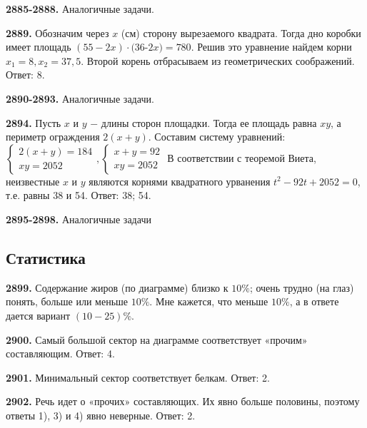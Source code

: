 \textbf{2885-2888.} Аналогичные задачи.

\textbf{2889.} Обозначим через $x$ (см) сторону вырезаемого квадрата. Тогда дно коробки имеет площадь $(55 - 2x)\cdot(36 $-$ 2x)=780$. Решив это уравнение найдем корни $x_1=8, x_2=37,5.$ Второй корень отбрасываем из геометрических соображений. \newline \null \hspace*{\fill} Ответ: 8. 

\textbf{2890-2893.} Аналогичные задачи.

\textbf{2894.} Пусть $x$ и $y$ $-$ длины сторон площадки. Тогда ее площадь равна $xy$, а периметр ограждения $2(x+y).$ Составим систему уравнений:\newline$
\begin{cases}
	2(x+y)=184\\
	xy=2052
\end{cases},
\begin{cases}
	x + y = 92\\
	xy=2052
\end{cases}$
В соответствии с теоремой Виета, неизвестные $x$ и $y$ являются корнями квадратного урванения $t^2 - 92t + 2052 = 0$, т.е. равны 38 и 54. \newline \null \hspace*{\fill} Ответ: 38; 54. 

\textbf{2895-2898.} Аналогичные задачи


\subsection{Статистика}

\textbf{2899.} Содержание жиров (по диаграмме) близко к $10\%$; очень трудно (на глаз) понять, больше или меньше $10\%.$ Мне кажется, что меньше $10\%$, а в ответе дается вариант  $(10-25)\%$.

\textbf{2900.} Самый большой сектор на диаграмме соответствует «прочим» составляющим. \newline \null \hspace*{\fill} Ответ: 4. 

\textbf{2901.} Минимальный сектор соответствует белкам. \newline \null \hspace*{\fill} Ответ: 2. 

\textbf{2902.} Речь идет о «прочих» составляющих. Их явно больше половины, поэтому ответы 1), 3) и 4) явно неверные. \newline \null \hspace*{\fill} Ответ: 2. 

